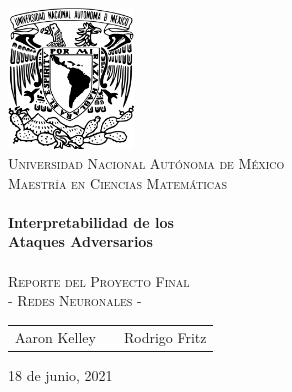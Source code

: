\begin{titlepage}
    \begin{center}
    \includegraphics[width=0.25\textwidth]{resources/unam_escudo.png}~\\[2cm]
    \textsc{\huge Universidad Nacional Autónoma de México}\\[0.5cm]  
    \textsc{\LARGE Maestría en Ciencias Matemáticas}\\[2cm]
    
    \HRule \\[0.5cm] 
    {\Huge \bfseries Interpretabilidad de los \\[1cm] Ataques Adversarios} \\[0.3cm] 
    \HRule \\[0.5cm]
    
    \textsc{\LARGE Reporte del Proyecto Final}\\[0.4cm]
    \textsc{\LARGE - Redes Neuronales - }\\[3cm]
    

    {\Large
    \begin{tabular}{ccc}
        Aaron Kelley & \hspace{1.5in} & Rodrigo Fritz
    \end{tabular}
    }
    \vfill

    {\Large 18 de junio, 2021}
    
    \end{center} 
\end{titlepage}